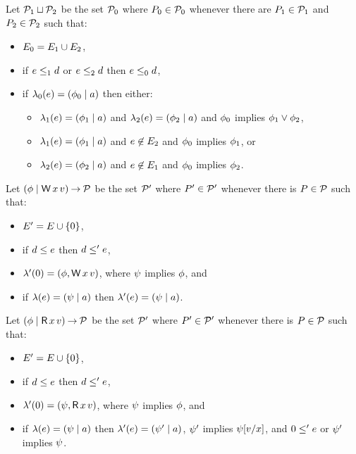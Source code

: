 Let $\mathcal{P}_1 \sqcup \mathcal{P}_2$ be the set $\mathcal{P}_0$ where $P_0 \in \mathcal{P}_0$
whenever there are $P_1 \in \mathcal{P}_1$ and  $P_2 \in \mathcal{P}_2$ such that:
\begin{itemize}
\item $E_0 = E_1 \cup E_2$,
\item if $e \le_1 d$ or $e \le_2 d$ then $e \le_0 d$,
\item if $\lambda_0(e) = (\phi_0 \mid a)$ then either:
  \begin{itemize}
  \item $\lambda_1(e) = (\phi_1 \mid a)$ and $\lambda_2(e) = (\phi_2 \mid a)$
    and $\phi_0$ implies $\phi_1 \lor \phi_2$,
  \item $\lambda_1(e) = (\phi_1 \mid a)$ and $e \not\in E_2$
    and $\phi_0$ implies $\phi_1$, or
  \item $\lambda_2(e) = (\phi_2 \mid a)$ and $e \not\in E_1$
    and $\phi_0$ implies $\phi_2$.
  \end{itemize}
\end{itemize}
Let $(\phi \mid \mathsf{W}\,x\,v) \mathbin\rightarrow \mathcal{P}$ be the set $\mathcal{P}'$ where $P'\in\mathcal{P}'$ whenever
there is $P\in\mathcal{P}$ such that:
\begin{itemize}
\item $E' = E \cup \{0\}$,
\item if $d \le e$ then $d \le' e$,
\item $\lambda'(0) = (\phi, \mathsf{W}\,x\,v)$, where $\psi$ implies $\phi$, and
\item if $\lambda(e) = (\psi \mid a)$ then $\lambda'(e) = (\psi \mid a)$.
\end{itemize}
Let $(\phi \mid \mathsf{R}\,x\,v) \mathbin\rightarrow \mathcal{P}$ be the set $\mathcal{P}'$ where $P'\in\mathcal{P}'$ whenever
there is $P\in\mathcal{P}$ such that:
\begin{itemize}
\item $E' = E \cup \{0\}$,
\item if $d \le e$ then $d \le' e$,
\item $\lambda'(0) = (\psi, \mathsf{R}\,x\,v)$, where $\psi$ implies $\phi$, and
\item if $\lambda(e) = (\psi \mid a)$ then
  $\lambda'(e) = (\psi' \mid a)$,
  $\psi'$ implies $\psi[v/x]$, and
  $0 \le' e$ or $\psi'$ implies $\psi$.
\end{itemize}
